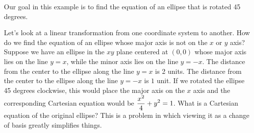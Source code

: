 \begin{example}
Our goal in this example is to find the equation of an ellipse that is rotated 45 degrees.



Let's look at a linear transformation from one coordinate system to another. How do we find the equation of an ellipse whose major axis is not on the $x$ or $y$ axis?  
Suppose we have an ellipse in the $xy$ plane centered at $(0,0)$ whose major axis lies on the line $y=x$, while the minor axis lies on the line $y=-x$. 
The distance from the center to the ellipse along the line $y=x$ is 2 units.  
The distance from the center to the ellipse along the line $y=-x$ is $1$ unit.  
If we rotated the ellipse 45 degrees clockwise, this would place the major axis on the $x$ axis and the corresponding Cartesian equation would be $\displaystyle \frac{x^2}{4}+y^2=1$. 
What is a Cartesian equation of the original ellipse? 
This is a problem in which viewing it as a change of basis greatly simplifies things.


\end{example}
